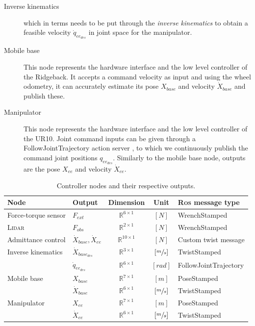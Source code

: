 \begin{description}
  \item[Inverse kinematics] which in terms needs to be put through the \emph{inverse kinematics} to obtain a feasible velocity $\dot{q}_{ee_{des}}$ in joint space for the manipulator.
  \item[Mobile base] This node represents the hardware interface and the low level controller of the Ridgeback. It accepts a command velocity as input and using the wheel odometry, it can accurately estimate its pose $X_{base}$ and velocity $\dot{X}_{base}$ and publish these.
  \item[Manipulator] This node represents the hardware interface and the low level controller of the UR10. Joint command inputs can be given through a FollowJointTrajectory action server \citep{rosJointTrajectory}, to which we continuously publish the command joint positions $q_{ee_{des}}$. Similarly to the mobile base node, outputs are the pose $X_{ee}$ and velocity $\dot{X}_{ee}$.
\end{description}

\begin{table}[h]
\begin{center}
 \caption{Controller nodes and their respective outputs.}\vspace{1ex}
 \label{tab:controller_nodes}
 \begin{tabular}{l|lccl}
 \hline
Node & Output & Dimension & Unit & \textsc{Ros} message type \\ \hline \hline
Force-torque sensor & $F_{ext}$ & $\mathbb{R}^{6 \times 1}$ & $[N]$ & WrenchStamped \\
\textsc{Lidar} & $F_{obs}$ & $\mathbb{R}^{2 \times 1}$ & $[N]$ & WrenchStamped \\
Admittance control & $\dot{X}_{base},\dot{X}_{ee}$ & $\mathbb{R}^{10 \times 1}$ & $[N]$ & Custom twist message \\
Inverse kinematics & $\dot{X}_{base_{des}}$ & $\mathbb{R}^{3 \times 1}$  & $[\sfrac{m}{s}]$ & TwistStamped \\
& $\dot{q}_{ee_{des}}$&$\mathbb{R}^{6 \times 1}$ & $[rad]$ & FollowJointTrajectory\\
Mobile base & $X_{base}$ & $\mathbb{R}^{7 \times 1}$ & $[m]$ & PoseStamped \\
& $\dot{X}_{base}$ & $\mathbb{R}^{6 \times 1}$ & $[\sfrac{m}{s}]$ & TwistStamped \\
Manipulator & $X_{ee}$ & $\mathbb{R}^{7 \times 1}$ & $[m]$ & PoseStamped \\
& $\dot{X}_{ee}$ & $\mathbb{R}^{6 \times 1}$ & $[\sfrac{m}{s}]$ & TwistStamped \\


 \hline
 \end{tabular}
\end{center}
\end{table}

